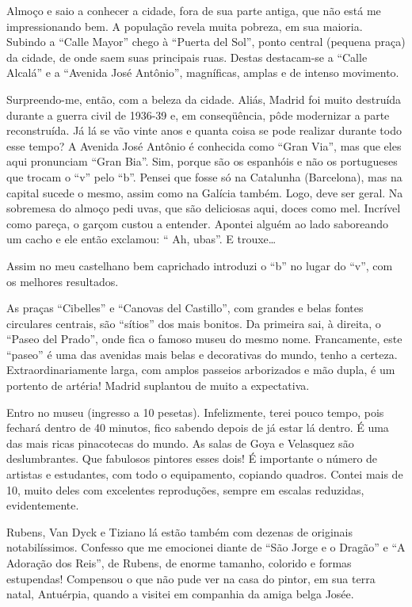 Almoço e saio a conhecer a cidade, fora de sua parte antiga, que não está me impressionando bem. A população revela muita pobreza, em sua maioria. Subindo a “Calle Mayor” chego à “Puerta del Sol”, ponto central (pequena praça) da cidade, de onde saem suas principais ruas. Destas destacam-se a “Calle Alcalá” e a “Avenida José Antônio”, magníficas, amplas e de intenso movimento.

Surpreendo-me, então, com a beleza da cidade. Aliás, Madrid foi muito destruída durante a guerra civil de 1936-39 e, em conseqüência, pôde modernizar a parte reconstruída. Já lá se vão vinte anos e quanta coisa se pode realizar durante todo esse tempo? A Avenida José Antônio é conhecida como “Gran Via”, mas que eles aqui pronunciam “Gran Bia”. Sim, porque são os espanhóis e não os portugueses que trocam o “v” pelo “b”. Pensei que fosse só na Catalunha (Barcelona), mas na capital sucede o mesmo, assim como na Galícia também. Logo, deve ser geral. Na sobremesa do almoço pedi uvas, que são deliciosas aqui, doces como mel. Incrível como pareça, o garçom custou a entender. Apontei alguém ao lado saboreando um cacho e ele então exclamou: “ Ah, ubas”. E trouxe\ldots

Assim no meu castelhano bem caprichado introduzi o “b” no lugar do “v”, com os melhores resultados.

As praças “Cibelles” e “Canovas del Castillo”, com grandes e belas fontes circulares centrais, são “sítios” dos mais bonitos. Da primeira sai, à direita, o “Paseo del Prado”, onde fica o famoso museu do mesmo nome. Francamente, este “paseo” é uma das avenidas mais belas e decorativas do mundo, tenho a certeza. Extraordinariamente larga, com amplos passeios arborizados e mão dupla, é um portento de artéria! Madrid suplantou de muito a expectativa.

Entro no museu (ingresso a 10 pesetas). Infelizmente, terei pouco tempo, pois fechará dentro de 40 minutos, fico sabendo depois de já estar lá dentro. É uma das mais ricas pinacotecas do mundo. As salas de Goya e Velasquez são deslumbrantes. Que fabulosos pintores esses dois! É importante o número de artistas e estudantes, com todo o equipamento, copiando quadros. Contei mais de 10, muito deles com excelentes reproduções, sempre em escalas reduzidas, evidentemente.

Rubens, Van Dyck e Tiziano lá estão também com dezenas de originais notabilíssimos. Confesso que me emocionei diante de “São Jorge e o Dragão” e “A Adoração dos Reis”, de Rubens, de enorme tamanho, colorido e formas estupendas! Compensou o que não pude ver na casa do pintor, em sua terra natal, Antuérpia, quando a visitei em companhia da amiga belga Josée.

